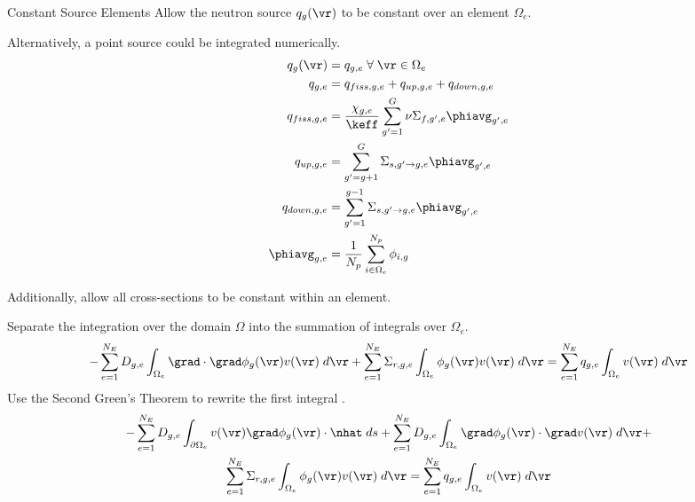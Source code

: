 \begin{frame}{Constant Source Elements}
  Allow the neutron source $q_g(\vr)$ to be constant over an element $\Omega_e$.

  Alternatively, a point source could be integrated numerically.
  \begin{align}
    q_g(\vr) &= q_{g,e} \; \forall \; \vr \in \Omega_e \\
    q_{g,e} &= q_{fiss,g,e} + q_{up,g,e} + q_{down,g,e} \\
    \label{eq:qelement_fiss}
    q_{fiss,g,e} &= \frac{\chi_{g,e}}{\keff} \sum_{g'=1}^G \nu
      \Sigma_{f,g',e} \phiavg_{g',e} \\
    \label{eq:qelement_up}
    q_{up,g,e} &= \sum_{g'=g+1}^G \Sigma_{s,g' \rightarrow g,e}
      \phiavg_{g',e}\\
    \label{eq:qelement_down}
    q_{down,g,e} &= \sum_{g'=1}^{g-1} \Sigma_{s,g' \rightarrow g,e}
      \phiavg_{g',e}\\
    \phiavg_{g,e} &= \frac{1}{N_p} \sum_{i \in \Omega_e}^{N_p} \phi_{i,g}
  \end{align}

  Additionally, allow all cross-sections to be constant within an element.
\end{frame}

\begin{frame}
  Separate the integration over the domain $\Omega$ into the summation of
  integrals over $\Omega_e$.
  \begin{equation} 
    \label{eq:element_by_element}
    -\sum_{e=1}^{N_E} D_{g,e} 
      \int_{\Omega_e} \grad \cdot \grad \phi_g(\vr) v(\vr) \; d\vr +
      \sum_{e=1}^{N_E} \Sigma_{r,g,e} \int_{\Omega_e} \phi_g(\vr) v(\vr) 
      \;d\vr = \sum_{e=1}^{N_E} q_{g,e} \int_{\Omega_e} v(\vr) 
      \; d\vr
  \end{equation}
  Use the Second Green's Theorem to rewrite the first integral
  \cite{textbookli}.
  \begin{multline} 
    -\sum_{e=1}^{N_E} D_{g,e} \int_{\partial \Omega_e} v(\vr) \grad
    \phi_g(\vr) \cdot \nhat \;ds + \sum_{e=1}^{N_E} 
      D_{g,e} \int_{\Omega_e} \grad \phi_g(\vr) \cdot \grad v(\vr) 
      \; d\vr + \\
      \sum_{e=1}^{N_E} \Sigma_{r,g,e} \int_{\Omega_e} \phi_g(\vr) v(\vr) 
     \; d\vr =
      \sum_{e=1}^{N_E} q_{g,e} \int_{\Omega_e} v(\vr) \; d\vr
  \end{multline}
\end{frame}

